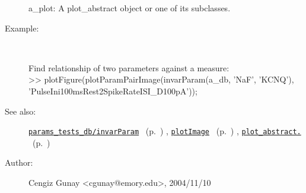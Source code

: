 \begin{description}
	a\_plot: A plot\_abstract object or one of its subclasses.
%
\item[Example:]~
\begin{lyxcode} Find relationship of two parameters against a measure:
\\%
 >> plotFigure(plotParamPairImage(invarParam(a\_db, {'NaF', 'KCNQ'}), 'PulseIni100msRest2SpikeRateISI\_D100pA'));
\\%
\end{lyxcode}
%
\item[See also:]%
\hyperlink{ref_params_tests_db__invarParam}{\texttt{params\_tests\_db/invarParam}}%
\ (p.~\pageref{ref_params_tests_db__invarParam})%
%
, \hyperlink{ref_plotImage}{\texttt{plotImage}}%
\ (p.~\pageref{ref_plotImage})%
%
, \hyperlink{ref_plot_abstract.}{\texttt{plot\_abstract.}}%
\ (p.~\pageref{ref_plot_abstract.})%
%
%
\item[Author:]%
Cengiz Gunay <cgunay@emory.edu>, 2004/11/10
%
\end{description}
\methodline%
